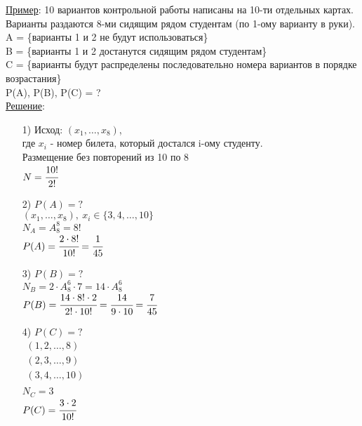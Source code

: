 \underline{Пример}: 10 вариантов контрольной работы написаны на 10-ти отдельных картах. Варианты раздаются 8-ми сидящим рядом студентам (по 1-ому варианту в руки). \\
A = \{варианты 1 и 2 не будут использоваться\} \\
B = \{варианты 1 и 2 достанутся сидящим рядом студентам\} \\
C = \{варианты будут распределены последовательно номера вариантов в порядке возрастания\} \\
P(A), P(B), P(C) = ? \\
\underline{Решение}: 
\begin{enumerate}
\item[1)] 
Исход: $(x_1, \ldots, x_8)$, \\
где $x_i$ - номер билета, который достался i-ому студенту. \\
Размещение без повторений из 10 по 8 \\
$N = \cfrac{10!}{2!}$ \\

\item[2)] $P(A) = ?$ \\
$(x_1, \ldots, x_8), \ x_i \in \{3,4, \ldots, 10\}$ \\
$N_A = A^8_8 = 8!$ \\
$P(A) = \cfrac{2 \cdot 8!}{10!} = \cfrac{1}{45}$ \\ 

\item[3)] $P(B) = ?$ \\

$N_B = 2 \cdot A^6_8 \cdot 7 = 14 \cdot A^6_8$ \\
$P(B) = \cfrac{14 \cdot 8! \cdot 2}{2! \cdot 10!} = \cfrac{14}{9 \cdot 10} = \cfrac{7}{45}$ \\

\item[4)] $P(C) = ?$ \\
$\begin{array}{lll}
	(1,2, \ldots, 8) \\
	(2,3, \ldots, 9) \\
	(3,4, \ldots, 10) \\
\end{array}$ \\
$N_C = 3$ \\
$P(C) = \cfrac{3 \cdot 2}{10!}$ \\
\end{enumerate}


